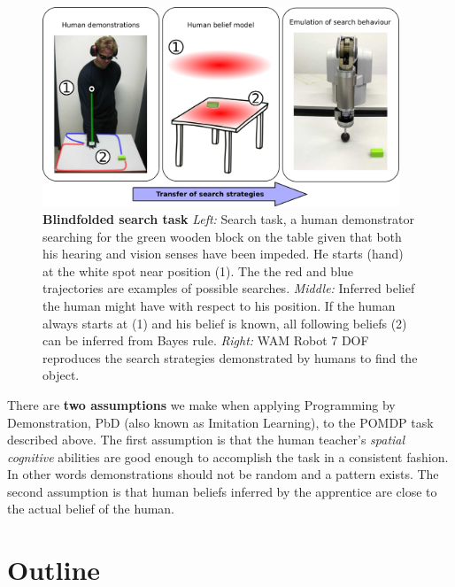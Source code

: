 \begin{figure}[h]
  \centering
  \includegraphics[width=0.95\textwidth]{./ch3-Search/Figures/Figure1.pdf}
  \caption{\textbf{Blindfolded search task} \textit{Left:}  Search task, a human demonstrator searching for the green wooden block on the table given
  that both his hearing and vision senses have been impeded. He starts (hand) at the white spot near position (1). The the red and blue trajectories 
  are examples of possible searches.
  \textit{Middle:} Inferred belief the human might have with respect to his position. If the human always starts at (1) and his belief is known, all 
  following beliefs (2) can be inferred from Bayes rule. \textit{Right:} WAM Robot 7 DOF
  reproduces the search strategies demonstrated by humans to find the object.}
 \label{fig:searching}
\end{figure} 

There are \textbf{two assumptions} we make when applying Programming by Demonstration, PbD (also known as Imitation Learning), to the POMDP task described above. 
The first assumption is that the human teacher's \textit{spatial cognitive} abilities are good enough to accomplish 
the task in a consistent fashion. In other words demonstrations should not be random and a pattern exists. The second assumption is that human beliefs inferred  
by the apprentice are close to the actual belief of the human. 

\section{Outline}

